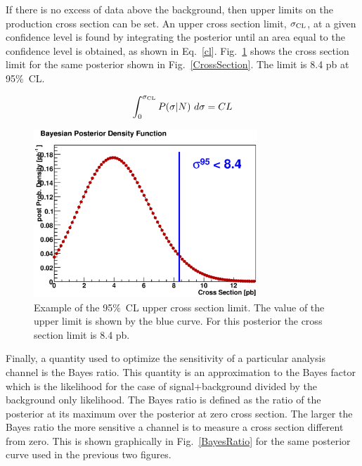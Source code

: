 If there is no excess of data above the background, then upper limits on the production cross section can be set. An upper cross section limit, $\sigma_{\rm{CL}}$, at a given confidence level is found by integrating the posterior until an area equal to the confidence level is obtained, as shown in Eq.~\ref{cl}. Fig.~\ref{CrossSectionLimit} shows the cross section limit for the same posterior shown in Fig.~\ref{CrossSection}. The limit is 8.4 pb at 95$\%$~CL.

\begin{equation}
\label{cl}
\int_{0}^{\sigma_{\rm{CL}}} P(\sigma|N)~d\sigma = CL
\end{equation}



\begin{figure}[!h!tbp]
\begin{center}
\includegraphics[width=0.75\textwidth]{eps/Limits/Limit.eps}
\end{center}
\vspace{-0.1in}
\caption{Example of the 95$\%$~CL upper cross section limit. The value of the upper limit is shown by the blue curve. For this posterior the cross section limit is 8.4 pb.}
\label{CrossSectionLimit}
\end{figure}

Finally, a quantity used to optimize the sensitivity of a particular analysis channel is the Bayes ratio. This quantity is an approximation to the Bayes factor which is the likelihood for the case of signal+background divided by the background only likelihood. The Bayes ratio is defined as the ratio of the posterior at its maximum over the posterior at zero cross section. The larger the Bayes ratio the more sensitive a channel is to measure a cross section different from zero. This is shown graphically in Fig.~\ref{BayesRatio} for the same posterior curve used in the previous two figures.

